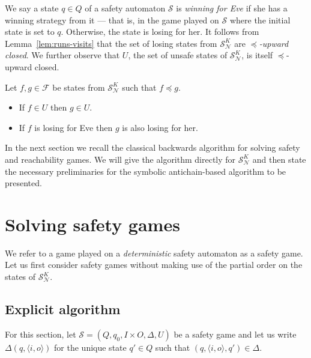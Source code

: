 \documentclass[runningheads,a4paper,draft]{llncs}
\newcommand{\eve}{Eve\xspace}
\newcommand{\calN}{\mathcal{N}}
\newcommand{\calS}{\mathcal{S}}
\begin{document}
We say a state $q \in Q$ of a safety automaton $\calS$ is \emph{winning for \eve}
if she has a winning strategy from it --- that is, in the game played on
\(\calS\) where the initial state is set to \(q\). Otherwise, the
state is losing for her. It follows from Lemma~\ref{lem:runs-visits} that the set of
losing states from $\calS^K_\calN$ are \emph{$\preceq$-upward closed}. We further
observe that $U$, the set of unsafe states of \(\calS^K_\calN\), is itself
$\preceq$-upward closed.
\begin{proposition}\label{pro:up-closed}
  Let $f,g \in \mathcal{F}$ be states from $\calS^K_\calN$ such that $f
  \preceq g$.
  \begin{itemize}
    \item If $f \in U$ then $g \in U$.
    \item If $f$ is losing for \eve then $g$ is also losing for her.
  \end{itemize}
\end{proposition}

In the next section we recall the classical backwards algorithm for solving
safety and reachability games. We will give the algorithm directly for
$\calS^K_\calN$ and then state the necessary preliminaries for the symbolic
antichain-based algorithm to be presented.

\section{Solving safety games}
We refer to a game played on a \emph{deterministic} safety automaton as a safety
game. Let us first consider safety games without making use of the partial order
on the states of \(\calS^K_\calN\).

\subsection{Explicit algorithm}
For this section, let $\calS = (Q,q_0, I \times O, \Delta, U)$ be a safety
game and let us write $\Delta(q,\langle i, o \rangle)$ for the unique state
$q' \in Q$ such that $(q, \langle i, o \rangle, q') \in \Delta$.
\end{document}
